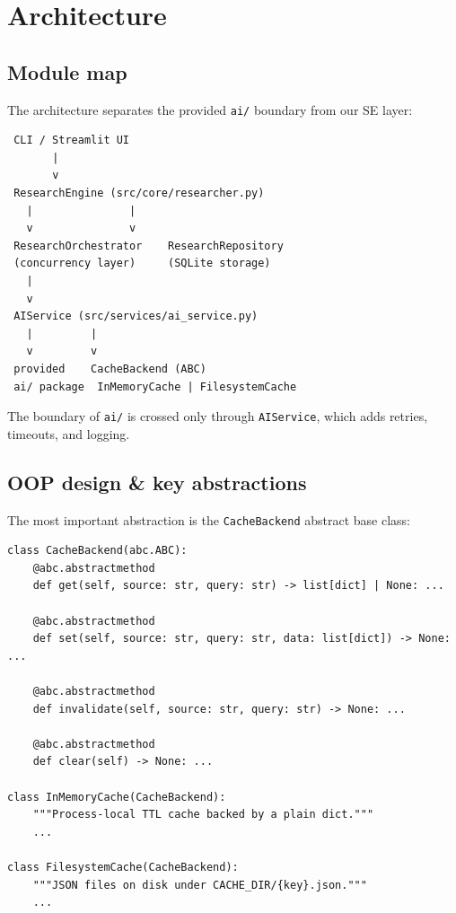 \documentclass[11pt,a4paper]{article}
\begin{document}
\section{Architecture}\label{sec:arch}

\subsection{Module map}

The architecture separates the provided \texttt{ai/} boundary from our SE layer:

\begin{center}
\begin{small}
\begin{verbatim}
 CLI / Streamlit UI
       |
       v
 ResearchEngine (src/core/researcher.py)
   |               |
   v               v
 ResearchOrchestrator    ResearchRepository
 (concurrency layer)     (SQLite storage)
   |
   v
 AIService (src/services/ai_service.py)
   |         |
   v         v
 provided    CacheBackend (ABC)
 ai/ package  InMemoryCache | FilesystemCache
\end{verbatim}
\end{small}
\end{center}

The boundary of \texttt{ai/} is crossed only through \texttt{AIService}, which adds retries, timeouts, and logging.

\subsection{OOP design \& key abstractions}

The most important abstraction is the \texttt{CacheBackend} abstract base class:

\begin{lstlisting}[style=python]
class CacheBackend(abc.ABC):
    @abc.abstractmethod
    def get(self, source: str, query: str) -> list[dict] | None: ...

    @abc.abstractmethod
    def set(self, source: str, query: str, data: list[dict]) -> None: ...

    @abc.abstractmethod
    def invalidate(self, source: str, query: str) -> None: ...

    @abc.abstractmethod
    def clear(self) -> None: ...

class InMemoryCache(CacheBackend):
    """Process-local TTL cache backed by a plain dict."""
    ...

class FilesystemCache(CacheBackend):
    """JSON files on disk under CACHE_DIR/{key}.json."""
    ...
\end{lstlisting}
\end{document}
